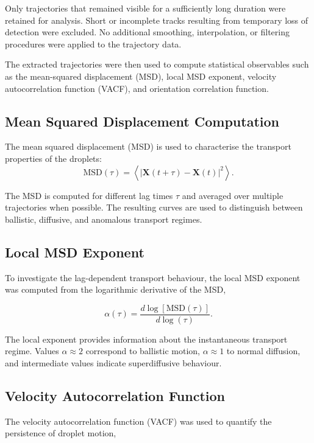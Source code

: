 Only trajectories that remained visible for a sufficiently long duration were retained for analysis. Short or incomplete tracks resulting from temporary loss of detection were excluded. No additional smoothing, interpolation, or filtering procedures were applied to the trajectory data.

The extracted trajectories were then used to compute statistical observables such as the mean-squared displacement (MSD), local MSD exponent, velocity autocorrelation function (VACF), and orientation correlation function.
\subsection{Mean Squared Displacement Computation}

The mean squared displacement (MSD)\cite{klafter2011} is used to characterise the transport properties of the droplets:
\begin{equation}
\mathrm{MSD}(\tau)
=
\left\langle
|\mathbf{X}(t+\tau)-\mathbf{X}(t)|^2
\right\rangle.
\end{equation}

The MSD is computed for different lag times \(\tau\) and averaged over multiple trajectories when possible. The resulting curves are used to distinguish between ballistic, diffusive, and anomalous transport regimes.


\subsection{Local MSD Exponent}

To investigate the lag-dependent transport behaviour, the local MSD exponent was computed from the logarithmic derivative of the MSD\cite{balakrishnan2021},

\begin{equation}
\alpha(\tau)
=
\frac{d\log[\mathrm{MSD}(\tau)]}
     {d\log(\tau)}.
\end{equation}

The local exponent provides information about the instantaneous transport regime. Values
$\alpha \approx 2$ correspond to ballistic motion, $\alpha \approx 1$ to normal diffusion,
and intermediate values indicate superdiffusive behaviour.
\subsection{Velocity Autocorrelation Function}
The velocity autocorrelation function (VACF)\cite{balakrishnan2021} was used to quantify
the persistence of droplet motion,

